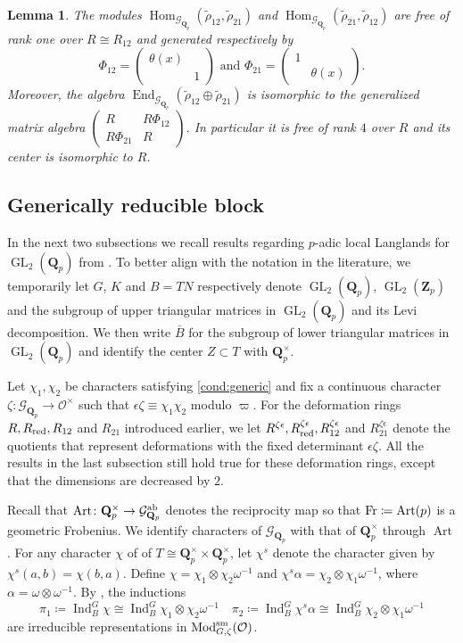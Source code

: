 \documentclass[leqno]{amsart}
\newtheorem{lem}[thm]{Lemma}
\theoremstyle{definition}
\theoremstyle{remark}
\newcommand{\smat}[1]{\left(\begin{smallmatrix} #1 \end{smallmatrix}\right)}
\newcommand{\oo}{\mathcal{O}}
\newcommand{\Qp}{\mathbf{Q}_p}
\newcommand{\Zp}{\mathbf{Z}_p}
\DeclareMathOperator{\End}{End}
\DeclareMathOperator{\Hom}{Hom}
\DeclareMathOperator{\Ind}{Ind}
\DeclareMathOperator{\GL}{GL}
\DeclareMathOperator{\Art}{Art}
\newcommand{\Fr}{\textnormal{Fr}} %
\DeclareMathOperator{\Mod}{\textnormal{Mod}}
\newcommand{\Gp}{\mathcal{G}_{\Qp}} %
\newcommand{\sm}{\textnormal{sm}}
\newcommand{\red}{\textnormal{red}}
\begin{document}
\begin{lem}\cite[Prop B.26]{pask}
\label{lem:B26}
The modules
$\Hom_{\Gp}(\tilde{\rho}_{12}, \tilde{\rho}_{21})$ and
$\Hom_{\Gp}(\tilde{\rho}_{21}, \tilde{\rho}_{12})$
are free of rank one over $R\cong R_{12}$ and
generated respectively by
\begin{equation}\label{eq:Phi_ij}
	\Phi_{12}=\smat{\theta(x)&\\&1} \text{ and }
	\Phi_{21}=\smat{1&\\&\theta(x)}.
\end{equation}
Moreover, the algebra
$\End_{\Gp}(\tilde{\rho}_{12}\oplus \tilde{\rho}_{21})$
is isomorphic to the generalized matrix algebra
$\smat{R& R\Phi_{12}\\ R\Phi_{21}& R}$.
In particular it is free of rank $4$ over $R$ and
its center is isomorphic to $R$.
\end{lem}

\subsection{Generically reducible block}

In the next two subsections
we recall results regarding
$p$-adic local Langlands for $\GL_2(\Qp)$
from \cite{pask}.
To better align with the notation in the literature,
we temporarily let $G$, $K$ and $B=TN$ respectively
denote $\GL_2(\Qp)$, $\GL_2(\Zp)$
and the subgroup of upper triangular matrices in $\GL_2(\Qp)$
and its Levi decomposition.
We then write $\bar{B}$ for
the subgroup of lower triangular matrices in $\GL_2(\Qp)$
and identify the center $Z\subset T$ with $\Qp^\times$.

Let $\chi_1,\chi_2$ be characters satisfying
\eqref{cond:generic} and fix a continuous character 
$\zeta\colon \Gp\to \oo^\times$
such that $\epsilon\zeta\equiv \chi_1\chi_2$ 
modulo $\varpi$.
For the deformation rings
$R, R_{\red}, R_{12}$ and $R_{21}$
introduced earlier, we let 
$R^{\zeta\epsilon}, R^{\zeta\epsilon}_{\red}, 
R^{\zeta\epsilon}_{12}$ and $R^{\zeta\epsilon}_{21}$
denote the quotients that represent
deformations with the
fixed determinant $\epsilon\zeta$.
All the results in the last subsection
still hold true for these deformation rings,
except that the dimensions are decreased by $2$.

Recall that 
$\Art\colon \Qp^\times\to \Gp^{\textnormal{ab}}$
denotes the reciprocity map
so that $\Fr\coloneqq \Art(p)$
is a geometric Frobenius.
We identify characters of $\Gp$ 
with that of $\Qp^\times$ through $\Art$.
For any character $\chi$ of 
of $T\cong \Qp^\times\times\Qp^\times$,
let $\chi^s$
denote the character given by 
$\chi^s(a,b)=\chi(b,a)$.
Define 
$\chi=\chi_1\otimes\chi_2\omega^{-1}$ and
$\chi^s\alpha=\chi_2\otimes \chi_1\omega^{-1}$,
where  $\alpha=\omega\otimes\omega^{-1}$.
By \cite[Thm 30]{barthel},
the inductions
\[
\pi_1\coloneqq \Ind_{B}^G\chi\cong
\Ind_{B}^G\chi_1\otimes\chi_2\omega^{-1}\quad
\pi_2\coloneqq \Ind_{B}^G\chi^s\alpha\cong 
\Ind_{B}^G\chi_2\otimes\chi_1\omega^{-1} 
\]
are irreducible representations
in $\Mod^{\sm}_{G,\zeta}(\oo)$.
\end{document}
